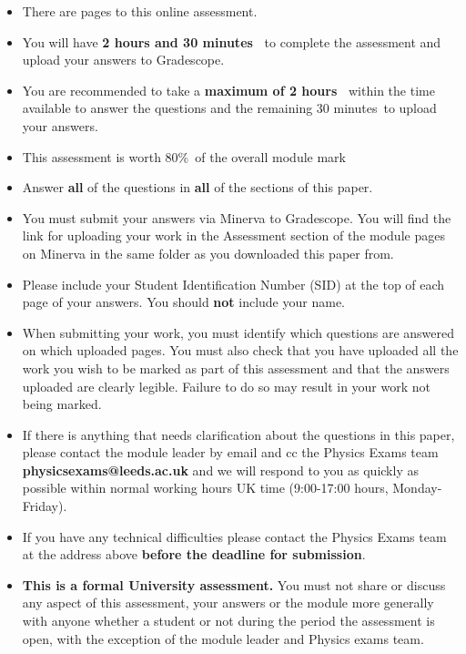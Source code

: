 \documentclass[12pt]{article}
\def\totaltime{2 hours and 30 minutes\ } %
\def\answertime{2 hours\ } %
\def\uploadtime{30 minutes}%
\def\paperweight{80\%\ }
\begin{document}
\begin{itemize}[itemsep=0pt,topsep=0pt]
\item There are \pageref{LastPage} pages to this online assessment.
\item You will have \textbf{\totaltime} to complete the assessment and upload your answers to Gradescope.
\item You are recommended to take a \textbf{maximum of \answertime} within the time available to answer the questions and the remaining \uploadtime\ to upload your answers. 
\item This assessment is worth \paperweight of the overall module mark
\item Answer \textbf{all} of the questions in \textbf{all} of the sections of this paper.
\item You must submit your answers via Minerva to Gradescope. You will find the link for uploading your work in the Assessment section of the module pages on Minerva in the same folder as you downloaded this paper from.
\item Please include your Student Identification Number (SID) at the top of each page of your answers. You should \textbf{not} include your name.
\item When submitting your work, you must identify which questions are answered on which uploaded pages. You must also check that you have uploaded all the work you wish to be marked as part of this assessment and that the answers uploaded are clearly legible. Failure to do so may result in your work not being marked.
\item If there is anything that needs clarification about the questions in this paper, please contact the module leader by email and cc the Physics Exams team \textbf{physicsexams@leeds.ac.uk} and we will respond to you as quickly as possible within normal working hours UK time (9:00-17:00 hours, Monday-Friday). 
\item If you have any technical difficulties please contact the Physics Exams team at the address above \textbf{before the deadline for submission}.
\item \textbf{This is a formal University assessment.} You must not share or discuss any aspect of this assessment, your answers or the module more generally with anyone whether a student or not during the period the assessment is open, with the exception of the module leader and Physics exams team.
\end{itemize}	
	
\end{document}

